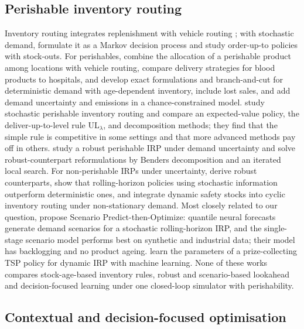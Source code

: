 \subsection{Perishable inventory routing}

Inventory routing integrates replenishment with vehicle routing \citep{coelho2014thirty}; with stochastic demand, \citet{kleywegt2002stochastic} formulate it as a Markov decision process and \citet{bertazzi2013stochastic} study order-up-to policies with stock-outs. For perishables, \citet{federgruen1986allocation} combine the allocation of a perishable product among locations with vehicle routing, \citet{hemmelmayr2009delivery} compare delivery strategies for blood products to hospitals, \citet{coelho2014optimal} and \citet{alvarez2020formulations} develop exact formulations and branch-and-cut for deterministic demand with age-dependent inventory, \citet{mirzaei2015considering} include lost sales, and \citet{soysal2015modeling} add demand uncertainty and emissions in a chance-constrained model. \citet{crama2018stochastic} study stochastic perishable inventory routing and compare an expected-value policy, the deliver-up-to-level rule UL$_\lambda$, and decomposition methods; they find that the simple rule is competitive in some settings and that more advanced methods pay off in others. \citet{he2024robust} study a robust perishable IRP under demand uncertainty and solve robust-counterpart reformulations by Benders decomposition and an iterated local search. For non-perishable IRPs under uncertainty, \citet{solyali2012robust} derive robust counterparts, \citet{coelho2014heuristics} show that rolling-horizon policies using stochastic information outperform deterministic ones, and \citet{malicki2021cyclic} integrate dynamic safety stocks into cyclic inventory routing under non-stationary demand. Most closely related to our question, \citet{jia2025scenario} propose Scenario Predict-then-Optimize: quantile neural forecasts generate demand scenarios for a stochastic rolling-horizon IRP, and the single-stage scenario model performs best on synthetic and industrial data; their model has backlogging and no product ageing. \citet{greif2024combinatorial} learn the parameters of a prize-collecting TSP policy for dynamic IRP with machine learning. None of these works compares stock-age-based inventory rules, robust and scenario-based lookahead and decision-focused learning under one closed-loop simulator with perishability.

\subsection{Contextual and decision-focused optimisation}

